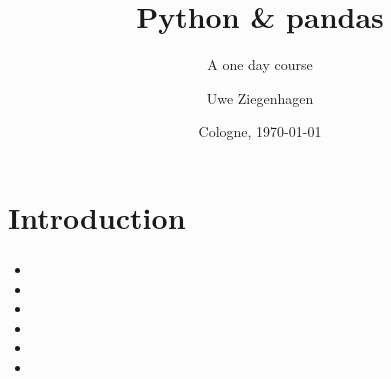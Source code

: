 \documentclass[ngerman]{beamer}
\author{Uwe Ziegenhagen}
\title{Python \& pandas}
\subtitle{A one day course}
\institute{\url{github.com/UweZiegenhagen/OneDayPythonPandasCourse}}
\date{Cologne, \today}
\begin{document}
\begin{frame}

\maketitle

\end{frame}

\section{Introduction}

\begin{frame}
\frametitle{}

\begin{itemize}
	\item 
	\item 
	\item 
	\item 
	\item 
	\item 
\end{itemize}

\end{frame}

\begin{frame}

\tableofcontents

\end{frame}
\end{document}
